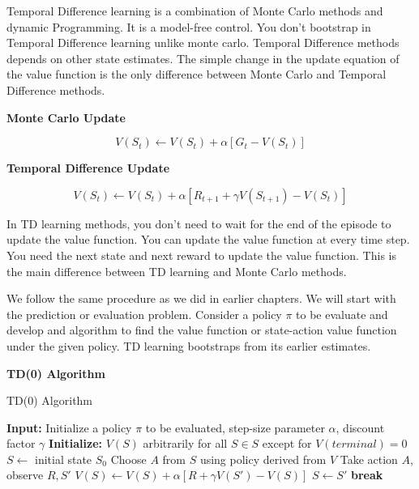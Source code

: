 \documentclass[../main.tex]{subfiles}
\begin{document}
Temporal Difference learning is a combination of Monte Carlo methods and dynamic Programming. It is a model-free control. You don't bootstrap in Temporal Difference learning unlike monte carlo. Temporal Difference methods depends on other state estimates.
The simple change in the update equation of the value function is the only difference between Monte Carlo and Temporal Difference methods.

\textbf{Monte Carlo Update}

\begin{equation}
V(S_t) \leftarrow V(S_t) + \alpha \left[G_t - V(S_t) \right] \nonumber
\end{equation}

\textbf{Temporal Difference Update}

\begin{equation}
V(S_t) \leftarrow V(S_t) + \alpha \left[ R_{t+1} + \gamma V(S_{t+1}) - V(S_t) \right] \nonumber
\end{equation}

In TD learning methods, you don't need to wait for the end of the episode to update the value function. You can update the value function at every time step. You need the next state and next reward to update the value function. This is the main difference between TD learning and Monte Carlo methods.

We follow the same procedure as we did in earlier chapters. We will start with the prediction or evaluation problem. Consider a policy $\pi$ to be evaluate and develop and algorithm to find the value function or state-action value function under the given policy. TD learning bootstraps from its earlier estimates.

\textbf{TD(0) Algorithm}

\begin{algorithm}
\caption{TD(0) Algorithm}
\begin{algorithmic}[1]
\State \textbf{Input:} Initialize a policy $\pi$ to be evaluated, step-size parameter $\alpha$, discount factor $\gamma$
\State \textbf{Initialize:} $V(S) $ arbitrarily for all $S \in S$ except for $V(terminal) = 0$ 
\State  $S \leftarrow$ initial state $S_0$
\State  Choose $A$ from $S$ using policy derived from $V$
\State  Take action $A$, observe $R, S'$
\State  $V(S) \leftarrow V(S) + \alpha \left[ R + \gamma V(S') - V(S) \right]$
\State  $S \leftarrow S'$
\State \textbf{break}
\EndIf
\EndFor
\EndWhile
\end{algorithmic}
\end{algorithm}
\end{document}

